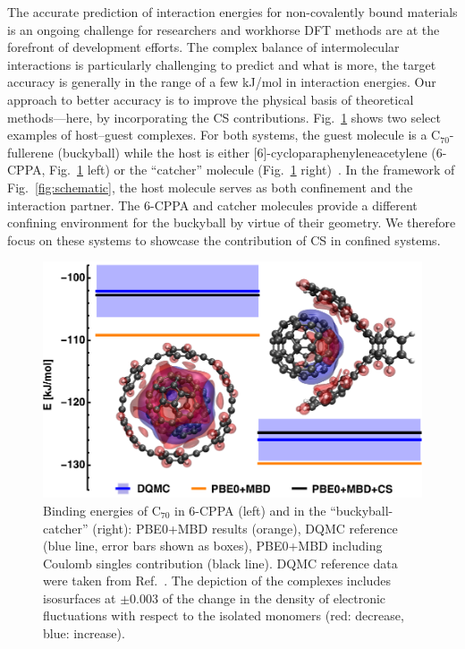 \documentclass[aps,prl,groupaddress, twocolumn]{revtex4-1}  %
\begin{document}
The accurate prediction of interaction energies for non-covalently bound materials is an ongoing challenge for researchers and workhorse DFT methods are at the forefront of development efforts. The complex balance of intermolecular interactions is particularly challenging to predict and what is more, the target accuracy is generally in the range of a few kJ/mol in interaction energies. Our approach to better accuracy is to improve the physical basis of theoretical methods---here, by incorporating the CS contributions.
Fig.~\ref{fig:flagshipsystems} shows two select examples of host--guest complexes. For both systems, the guest molecule is a C$_{70}$-fullerene (buckyball) while the host is either [6]-cycloparaphenyleneacetylene (6-CPPA, Fig.~\ref{fig:flagshipsystems} left) or the ``catcher'' molecule (Fig.~\ref{fig:flagshipsystems} right)~\cite{s12l_2013}. In the framework of Fig.~\ref{fig:schematic}, the host molecule serves as both confinement and the interaction partner. The 6-CPPA and catcher molecules provide a different confining environment for the buckyball by virtue of their geometry. We therefore focus on these systems to showcase the contribution of CS in confined systems.
\begin{figure}[htp!]
\centering
\includegraphics[scale=0.68]{Plots/S12L4b.eps}
\caption{Binding energies of C$_{70}$ in 6-CPPA (left) and in the ``buckyball-catcher'' (right):
PBE0+MBD results (orange), DQMC reference (blue line, error bars shown as boxes), PBE0+MBD including Coulomb singles contribution (black line).
DQMC reference data were taken from Ref.~\cite{hermann_ncomm2017}.
The depiction of the complexes includes isosurfaces at $\pm$0.003 of the change in the density of electronic fluctuations with respect to the isolated monomers (red: decrease, blue: increase).
}\label{fig:flagshipsystems}
\end{figure}
\end{document}
